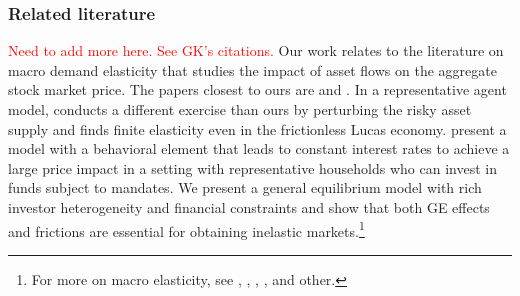 %

\subsubsection*{Related literature} 
\textcolor{red}{Need to add more here. See GK's citations.}
Our work relates to the literature on macro demand elasticity that studies the impact of asset flows on the aggregate stock market price. The papers closest to ours are \cite{johnson2006dynamic} and \cite{gabaix2020search}. In a representative agent model, \cite{johnson2006dynamic} conducts a different exercise than ours by perturbing the risky asset supply and finds finite elasticity even in the frictionless Lucas economy. \cite{gabaix2020search} present a model with a behavioral element that leads to constant interest rates to achieve a large price impact in a setting with representative households who can invest in funds subject to mandates. We present a general equilibrium model with rich investor heterogeneity and financial constraints and show that both GE effects and frictions are essential for obtaining inelastic markets.\footnote{For more on macro elasticity, see \cite{johnson2008volume,johnson2009liquid}, \cite{Deuskar/Johnson/2011}, \cite{Li/Pearson/Zhang/2020}, \cite{Hartzmark/Solomon/2021}, and other.}%



